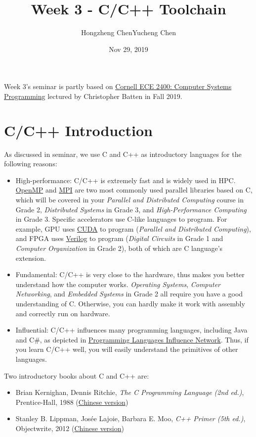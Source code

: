 \documentclass[english]{../TexTemplate/thesis}
\title{Week 3 - C/C++ Toolchain}
\author{Hongzheng Chen\qquad Yucheng Chen}
\date{Nov 29, 2019}
\begin{document}
\maketitle

Week 3's seminar is partly based on \href{https://cornell-ece2400.github.io/ece2400-docs/ece2400-sec2-c-basics/}{Cornell ECE 2400: Computer Systems Programming} lectured by Christopher Batten in Fall 2019.

\section{C/C++ Introduction}
As discussed in seminar, we use C and C++ as introductory languages for the following reasons:
\begin{itemize}
	\item High-performance: C/C++ is extremely fast and is widely used in HPC.
	\href{https://www.openmp.org/}{OpenMP} and \href{https://mpitutorial.com/tutorials/}{MPI} are two most commonly used parallel libraries based on C, which will be covered in your \emph{Parallel and Distributed Computing} course in Grade 2, \emph{Distributed Systems} in Grade 3, and \emph{High-Performance Computing} in Grade 3.
	Specific accelerators use C-like languages to program.
	For example, GPU uses \href{https://www.infoworld.com/article/3299703/what-is-cuda-parallel-programming-for-gpus.html}{CUDA} to program (\emph{Parallel and Distributed Computing}), and FPGA uses \href{https://www.doulos.com/knowhow/verilog_designers_guide/what_is_verilog/}{Verilog} to program (\emph{Digital Circuits} in Grade 1 and \emph{Computer Organization} in Grade 2), both of which are C language's extension.
	\item Fundamental: C/C++ is very close to the hardware, thus makes you better understand how the computer works.
	\emph{Operating Systems}, \emph{Computer Networking}, and \emph{Embedded Systems} in Grade 2 all require you have a good understanding of C.
	Otherwise, you can hardly make it work with assembly and correctly run on hardware.
	\item Influential: C/C++ influences many programming languages, including Java and C\#, as depicted in \href{https://exploring-data.com/vis/programming-languages-influence-network/}{Programming Languages Influence Network}.
	Thus, if you learn C/C++ well, you will easily understand the primitives of other languages.
\end{itemize}

Two introductory books about C and C++ are:
\begin{itemize}
	\item Brian Kernighan, Dennis Ritchie, \emph{The C Programming Language (2nd ed.)}, Prentice-Hall, 1988 (\href{https://book.douban.com/subject/1139336/}{Chinese version})
	\item Stanley B. Lippman, Josée Lajoie, Barbara E. Moo, \emph{C++ Primer (5th ed.)}, Objectwrite, 2012 (\href{https://book.douban.com/subject/25708312/}{Chinese version})
\end{itemize}
\end{document}
